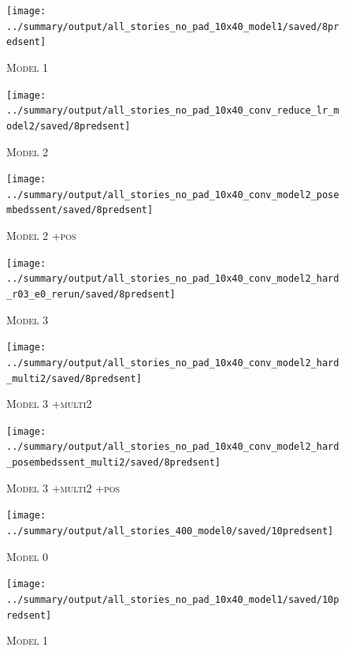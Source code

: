 \documentclass[12pt]{report}
\begin{document}
\begin{appendices}
\begin{figure}[p]
\centering
\texttt{[image: ../summary/output/all\_stories\_no\_pad\_10x40\_model1/saved/8predsent]}
\caption[\textsc{Model 1} Attention]{\textsc{Model 1}}
\end{figure}

\begin{figure}[p]
\centering
\texttt{[image: ../summary/output/all\_stories\_no\_pad\_10x40\_conv\_reduce\_lr\_model2/saved/8predsent]}
\caption[\textsc{Model 2} Attention]{\textsc{Model 2}}
\end{figure}

\begin{figure}[p]
\centering
\texttt{[image: ../summary/output/all\_stories\_no\_pad\_10x40\_conv\_model2\_posembedssent/saved/8predsent]}
\caption[\textsc{Model 2 +pos} Attention]{\textsc{Model 2 +pos}}
\end{figure}

\begin{figure}[p]
\centering
\texttt{[image: ../summary/output/all\_stories\_no\_pad\_10x40\_conv\_model2\_hard\_r03\_e0\_rerun/saved/8predsent]}
\caption[\textsc{Model 3} Attention]{\textsc{Model 3}}
\end{figure}

\begin{figure}[p]
\centering
\texttt{[image: ../summary/output/all\_stories\_no\_pad\_10x40\_conv\_model2\_hard\_multi2/saved/8predsent]}
\caption[\textsc{Model 3 +multi2} Attention]{\textsc{Model 3 +multi2}}
\end{figure}

\begin{figure}[p]
\centering
\texttt{[image: ../summary/output/all\_stories\_no\_pad\_10x40\_conv\_model2\_hard\_posembedssent\_multi2/saved/8predsent]}
\caption[\textsc{Model 3 +multi2 +pos} Attention]{\textsc{Model 3 +multi2 +pos}}
\end{figure}


\begin{figure}[p]
\centering
\texttt{[image: ../summary/output/all\_stories\_400\_model0/saved/10predsent]}
\caption[\textsc{Model 0} Attention]{\textsc{Model 0}}
\end{figure}

\begin{figure}[p]
\centering
\texttt{[image: ../summary/output/all\_stories\_no\_pad\_10x40\_model1/saved/10predsent]}
\caption[\textsc{Model 1} Attention]{\textsc{Model 1}}
\end{figure}


\end{appendices}
\end{document}

